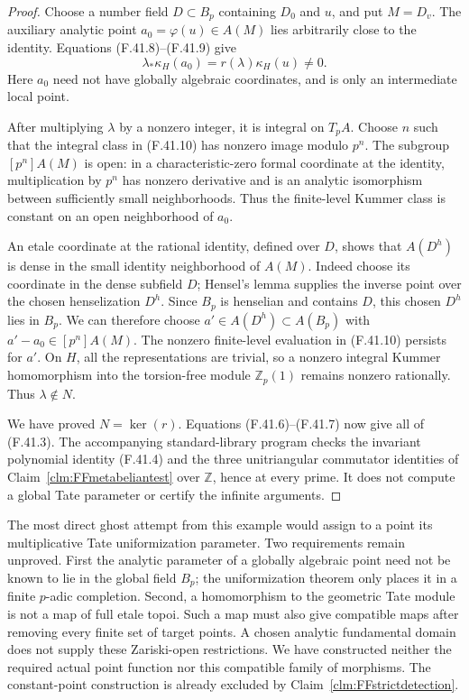 \documentclass[11pt]{article}
\begin{document}
\begin{proof}
Choose a number field
\(D\subset B_p\) containing \(D_0\)
and \(u\), and put \(M=D_v\).
The auxiliary analytic point
\(a_0=\varphi(u)\in A(M)\) lies
arbitrarily close to the identity.
Equations (F.41.8)--(F.41.9) give
\[
        \lambda_*\kappa_H(a_0)
              =r(\lambda)\kappa_H(u)\ne0.
                                                        \tag{F.41.10}
\]
Here \(a_0\) need not have globally
algebraic coordinates, and is only
an intermediate local point.

After multiplying \(\lambda\) by
a nonzero integer, it is integral
on \(T_pA\). Choose \(n\) such
that the integral class in
(F.41.10) has nonzero image modulo
\(p^n\). The subgroup
\([p^n]A(M)\) is open: in a
characteristic-zero formal coordinate
at the identity, multiplication by
\(p^n\) has nonzero derivative and
is an analytic isomorphism between
sufficiently small neighborhoods.
Thus the finite-level Kummer class
is constant on an open neighborhood
of \(a_0\).

An etale coordinate at the rational
identity, defined over \(D\), shows
that \(A(D^h)\) is dense in the
small identity neighborhood of
\(A(M)\). Indeed choose its coordinate
in the dense subfield \(D\); Hensel's
lemma supplies the inverse point
over the chosen henselization
\(D^h\). Since \(B_p\) is henselian
and contains \(D\), this chosen
\(D^h\) lies in \(B_p\). We can
therefore choose
\(a'\in A(D^h)\subset A(B_p)\)
with \(a'-a_0\in[p^n]A(M)\).
The nonzero finite-level evaluation
in (F.41.10) persists for \(a'\).
On \(H\), all the representations
are trivial, so a nonzero integral
Kummer homomorphism into the
torsion-free module \(\mathbb Z_p(1)\)
remains nonzero rationally.
Thus \(\lambda\notin N\).

We have proved \(N=\ker(r)\).
Equations (F.41.6)--(F.41.7)
now give all of (F.41.3).
The accompanying standard-library program
checks the invariant polynomial identity
(F.41.4) and the three unitriangular
commutator identities of
Claim~\ref{clm:FFmetabeliantest} over
\(\mathbb Z\), hence at every prime.
It does not compute a global Tate
parameter or certify the infinite arguments.
\end{proof}

The most direct ghost attempt from
this example would assign to a
point its multiplicative Tate
uniformization parameter. Two
requirements remain unproved.
First the analytic parameter of
a globally algebraic point need
not be known to lie in the global
field \(B_p\); the uniformization
theorem only places it in a finite
\(p\)-adic completion. Second, a
homomorphism to the geometric
Tate module is not a map of full
etale topoi. Such a map must also
give compatible maps after removing
every finite set of target points.
A chosen analytic fundamental
domain does not supply these
Zariski-open restrictions. We have
constructed neither the required
actual point function nor this
compatible family of morphisms.
The constant-point construction is
already excluded by
Claim~\ref{clm:FFstrictdetection}.
\end{document}

